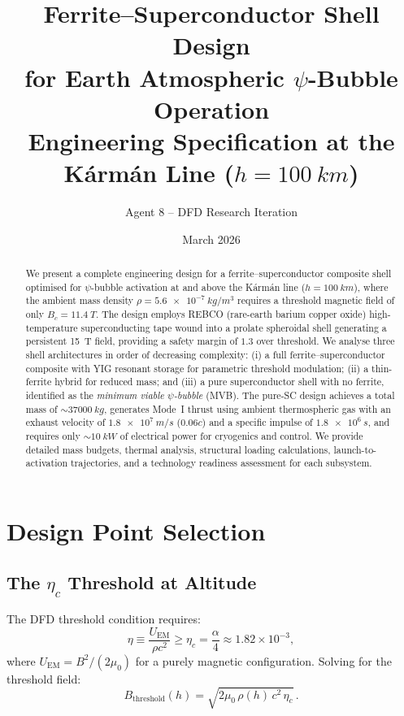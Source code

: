 \documentclass[11pt,a4paper]{article}
\title{Ferrite--Superconductor Shell Design\\for Earth Atmospheric $\psi$-Bubble Operation\\
\large Engineering Specification at the K\'arm\'an Line ($h = \SI{100}{km}$)}
\author{Agent 8 -- DFD Research Iteration}
\date{March 2026}
\begin{document}
\maketitle

\begin{abstract}
We present a complete engineering design for a ferrite--superconductor composite
shell optimised for $\psi$-bubble activation at and above the K\'arm\'an line
($h = \SI{100}{km}$), where the ambient mass density
$\rho = \SI{5.6e-7}{kg/m^3}$ requires a threshold magnetic field of only
$B_c = \SI{11.4}{T}$. The design employs REBCO (rare-earth barium copper oxide)
high-temperature superconducting tape wound into a prolate spheroidal shell
generating a persistent \SI{15}{T} field, providing a safety margin of $1.3$
over threshold. We analyse three shell architectures in order of decreasing
complexity: (i) a full ferrite--superconductor composite with YIG resonant
storage for parametric threshold modulation; (ii) a thin-ferrite hybrid for
reduced mass; and (iii) a pure superconductor shell with no ferrite, identified
as the \emph{minimum viable $\psi$-bubble} (MVB). The pure-SC design achieves a
total mass of $\sim\!\SI{37000}{kg}$, generates Mode~I thrust using ambient
thermospheric gas with an exhaust velocity of $\SI{1.8e7}{m/s}$ ($0.06c$) and a
specific impulse of $\SI{1.8e6}{s}$, and requires only $\sim\!\SI{10}{kW}$ of
electrical power for cryogenics and control. We provide detailed mass budgets,
thermal analysis, structural loading calculations, launch-to-activation
trajectories, and a technology readiness assessment for each subsystem.
\end{abstract}

\tableofcontents
\newpage

\section{Design Point Selection}\label{sec:design_point}

\subsection{The $\eta_c$ Threshold at Altitude}

The DFD threshold condition requires:
\begin{equation}\label{eq:eta_threshold}
\eta \equiv \frac{U_{\mathrm{EM}}}{\rho c^2} \geq \eta_c = \frac{\alpha}{4}
\approx 1.82 \times 10^{-3},
\end{equation}
where $U_{\mathrm{EM}} = B^2/(2\mu_0)$ for a purely magnetic configuration. Solving
for the threshold field:
\begin{equation}\label{eq:B_threshold}
B_{\mathrm{threshold}}(h) = \sqrt{2\mu_0 \,\rho(h)\, c^2 \,\eta_c}\,.
\end{equation}
\end{document}
